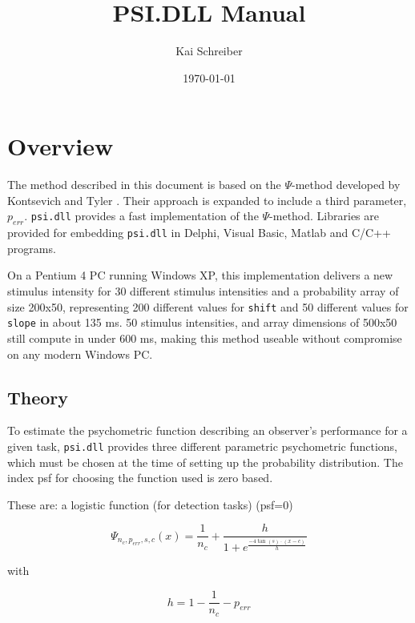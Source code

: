 \documentclass[10pt,letterpaper]{article}
\begin{document}
\title{PSI.DLL Manual} \author{Kai Schreiber} \date{\today} \maketitle

\tableofcontents

\section{Overview}

The method described in this document is based on the $\Psi$-method developed by 
Kontsevich and Tyler \cite{kontsevich:1999}. Their approach is expanded to 
include a third parameter, {\tt $p_{err}$}. {\tt psi.dll} provides a fast 
implementation of the $\Psi$-method. Libraries are provided for embedding
{\tt psi.dll} in Delphi, Visual Basic, Matlab and C/C++ programs. 

On a Pentium 4 PC running Windows XP, this implementation delivers a new 
stimulus intensity for 30 different stimulus intensities and a probability array 
of size 200x50, representing 200 different values for {\tt shift} and 50 different 
values for {\tt slope} in about 135 ms. 50 stimulus intensities, and array 
dimensions of 500x50 still compute in under 600 ms, making this method useable
without compromise on any modern Windows PC.

\subsection{Theory}

To estimate the psychometric function describing an observer's performance for a given task, 
{\tt psi.dll} provides three different parametric psychometric functions,
which must be chosen at the time of setting up the probability distribution. The
index psf for choosing the function used is zero based.

These are: a logistic function (for detection tasks) (psf=0)

\begin{equation}
\Psi_{n_c,p_{err},s,c}(x) = \frac{1}{n_c} + \frac{h}{1+e^{ 
      \frac{- 4 \tan(s) \cdot (x-c)} {h} 
      } }
\end{equation}

with

\begin{equation}
h = 1-\frac{1}{n_c} -p_{err}
\end{equation}
\end{document}
